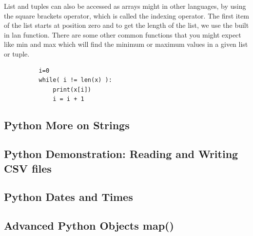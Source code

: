 \documentclass[11pt]{article}
\begin{document}
        List and tuples can also be accessed as arrays might in other
        languages, by using the square brackets operator, which is called the
        indexing operator. The first item of the list starts at position zero
        and to get the length of the list, we use the built in lan
        function. There are some other common functions that you might expect
        like min and max which will find the minimum or maximum values in a
        given list or tuple.
        \begin{lstlisting}
          i=0
          while( i != len(x) ):
              print(x[i])
              i = i + 1
          \end{lstlisting}

          

       
        
        
        
    


































\subsection{Python More on Strings}

\subsection{Python Demonstration: Reading and Writing CSV files}

\subsection{Python Dates and Times}

\subsection{Advanced Python Objects map()}
\end{document}
